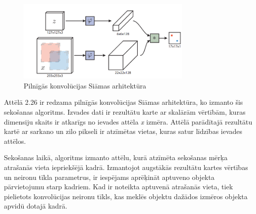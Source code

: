 \begin{figure}[h]%
	\centering
	\includegraphics[height=4cm]{images/siamfcarch.png} %
	\caption{Pilnīgās konvolūcijas Siāmas arhitektūra \cite{bertinetto2016fully}}%
	\label{fig:example}%
\end{figure} 

Attēlā 2.26 ir redzama pilnīgās konvolūcijas Siāmas arhitektūra, ko izmanto šis sekošanas algoritms. Izvades dati ir rezultātu karte ar skalārām vērtībām, kuras dimensiju skaits ir atkarīgs no ievades attēla \textit{x} izmēra. Attēlā parādītajā rezultātu kartē ar sarkano un zilo pikseli ir atzīmētas vietas, kuras satur līdzības ievades attēlos.  

Sekošanas laikā, algoritms izmanto attēlu, kurā atzīmēta sekošanas mērķa atrašanās vieta iepriekšējā kadrā. Izmantojot augstākās rezultātu kartes vērtības un neironu tīkla parametrus, ir iespējams aprēķināt aptuveno objekta pārvietojumu starp kadriem. Kad ir noteikta aptuvenā atrašanās vieta, tiek pielietots konvolūcijas neironu tīkls, kas meklēs objektu dažādos izmēros objekta apvidū dotajā kadrā.
